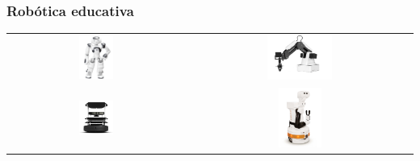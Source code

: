 \documentclass{beamer}
\begin{document}
\begin{frame}
\frametitle{Robótica educativa}
\begin{table}[htbp]
  \centering
  \begin{tabular}{cc}
      \includegraphics[width=0.2\textwidth, valign=m]{figs/nao.png} & \includegraphics[width=0.3\textwidth, valign=m]{figs/dobot.png} \\
      \includegraphics[width=0.2\textwidth, valign=m]{figs/turtlebot.jpg} & \includegraphics[width=0.2\textwidth, valign=m]{figs/tiago.jpg} 
  \end{tabular}
\end{table}
\end{frame}
\end{document}

